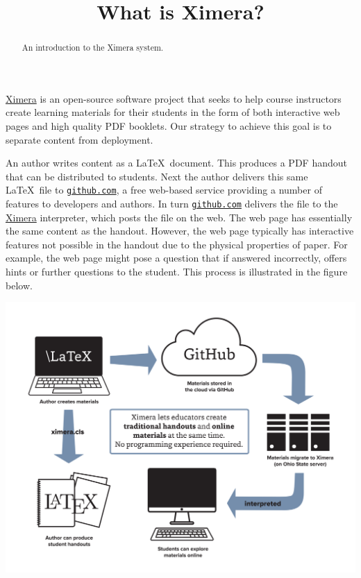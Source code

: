 \documentclass{ximera}
\title{What is Ximera?}
\begin{document}
\begin{abstract}
An introduction to the Ximera system.
\end{abstract}
\maketitle

\href{http://ximera.osu.edu}{\sf Ximera}
is an open-source software project that
seeks to help course instructors create learning materials
for their students in the form of both interactive
web pages and high quality PDF booklets.
Our strategy to achieve this goal is to separate
content from deployment.

An author writes content as a \LaTeX\ document.
This produces a PDF handout that can be distributed to students.
Next the author delivers this same \LaTeX\ file to
\href{http://github.com}{\tt github.com},
a free web-based service providing a number of features to developers and authors.
In turn \href{http://github.com}{\tt github.com} delivers
the file to the \href{http://ximera.osu.edu}{\sf Ximera}
interpreter, which posts the file on the web.
The web page has essentially the same content as the handout.
However, the web page typically has interactive features
not possible in the handout due to the physical properties of paper.
For example, the web page might pose a question
that if answered incorrectly, offers hints or further questions
to the student.
This process is illustrated in the figure below.

\begin{image}
\includegraphics[scale=.25]{XimeraGraphic.png}
\end{image}
\end{document}
